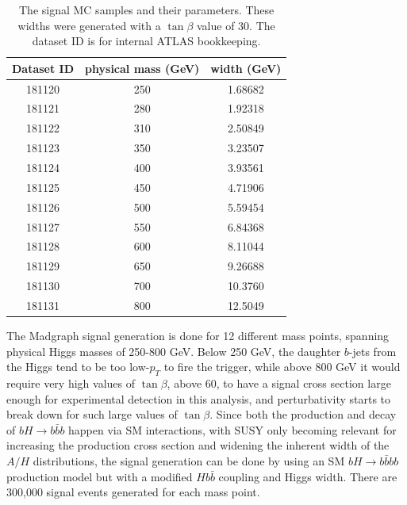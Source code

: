 


\begin{table}
   \caption{The signal MC samples and their parameters. These widths were generated with 
   a $\tan\beta$ value of 30.  The dataset ID is for internal ATLAS bookkeeping.\label{tab:sig_mc_parameters} }
    \center
    \begin{tabular}{ c c c } \hline\hline
    Dataset ID & physical mass (GeV) & width (GeV) \\ \hline
    181120     & 250        & 1.68682 \\
    181121     & 280        & 1.92318 \\
    181122     & 310        & 2.50849 \\
    181123     & 350        & 3.23507 \\
    181124     & 400        & 3.93561 \\
    181125     & 450        & 4.71906 \\
    181126     & 500        & 5.59454 \\
    181127     & 550        & 6.84368 \\
    181128     & 600        & 8.11044 \\
    181129     & 650        & 9.26688 \\
    181130     & 700        & 10.3760 \\
    181131     & 800        & 12.5049 \\ \hline
    \end{tabular}
\end{table}





The Madgraph signal generation is done for 12 different mass points, spanning physical
Higgs masses of 250-800 GeV. 
Below 250 GeV, the daughter $b$-jets from the Higgs tend to be 
too low-$p_T$ to fire the trigger, while above 800 GeV it would require very 
high values of $\tan\beta$, above 60, to have a signal cross section large enough
for experimental detection in this analysis, and perturbativity starts to break
down for such large values of $\tan\beta$.
Since both the production and decay of $bH\rightarrow b\bar{b}b$ 
happen via SM interactions, with SUSY only becoming relevant for increasing the production cross section and 
widening the inherent width of the $A/H$ distributions, the signal generation can 
be done by using an SM $bH\rightarrow b\bar{b}bb$ production model but with a 
modified $Hb\bar{b}$ coupling and Higgs width.  There are 300,000 signal events generated for each mass point.

